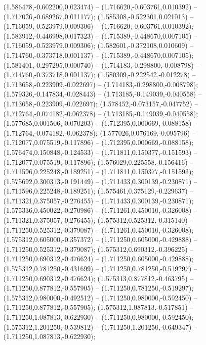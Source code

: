  (1.586478,-0.602200,0.023474) -- (1.716620,-0.603761,0.010392) -- (1.717026,-0.689267,0.011177);
 (1.585308,-0.522301,0.021013) -- (1.716059,-0.523979,0.009306) -- (1.716620,-0.603761,0.010392);
 (1.583912,-0.446998,0.017323) -- (1.715389,-0.448670,0.007105) -- (1.716059,-0.523979,0.009306);
 (1.582601,-0.372108,0.010609) -- (1.714760,-0.373718,0.001137) -- (1.715389,-0.448670,0.007105);
 (1.581401,-0.297295,0.000740) -- (1.714183,-0.298800,-0.008798) -- (1.714760,-0.373718,0.001137);
 (1.580309,-0.222542,-0.012278) -- (1.713658,-0.223909,-0.022697) -- (1.714183,-0.298800,-0.008798);
 (1.579326,-0.147834,-0.028443) -- (1.713185,-0.149039,-0.040558) -- (1.713658,-0.223909,-0.022697);
 (1.578452,-0.073157,-0.047752) -- (1.712764,-0.074182,-0.062378) -- (1.713185,-0.149039,-0.040558);
 (1.577685,0.001506,-0.070203) -- (1.712395,0.000669,-0.088158) -- (1.712764,-0.074182,-0.062378);
 (1.577026,0.076169,-0.095796) -- (1.712077,0.075519,-0.117896) -- (1.712395,0.000669,-0.088158);
 (1.576474,0.150848,-0.124533) -- (1.711811,0.150377,-0.151593) -- (1.712077,0.075519,-0.117896);
 (1.576029,0.225558,-0.156416) -- (1.711596,0.225248,-0.189251) -- (1.711811,0.150377,-0.151593);
 (1.575692,0.300313,-0.191449) -- (1.711433,0.300139,-0.230871) -- (1.711596,0.225248,-0.189251);
 (1.575461,0.375129,-0.229637) -- (1.711321,0.375057,-0.276455) -- (1.711433,0.300139,-0.230871);
 (1.575336,0.450022,-0.270986) -- (1.711261,0.450010,-0.326008) -- (1.711321,0.375057,-0.276455);
 (1.575312,0.525312,-0.315140) -- (1.711250,0.525312,-0.379087) -- (1.711261,0.450010,-0.326008);
 (1.575312,0.605000,-0.357372) -- (1.711250,0.605000,-0.429888) -- (1.711250,0.525312,-0.379087);
 (1.575312,0.690312,-0.396225) -- (1.711250,0.690312,-0.476624) -- (1.711250,0.605000,-0.429888);
 (1.575312,0.781250,-0.431699) -- (1.711250,0.781250,-0.519297) -- (1.711250,0.690312,-0.476624);
 (1.575313,0.877812,-0.463795) -- (1.711250,0.877812,-0.557905) -- (1.711250,0.781250,-0.519297);
 (1.575312,0.980000,-0.492512) -- (1.711250,0.980000,-0.592450) -- (1.711250,0.877812,-0.557905);
 (1.575312,1.087813,-0.517851) -- (1.711250,1.087813,-0.622930) -- (1.711250,0.980000,-0.592450);
 (1.575312,1.201250,-0.539812) -- (1.711250,1.201250,-0.649347) -- (1.711250,1.087813,-0.622930);
